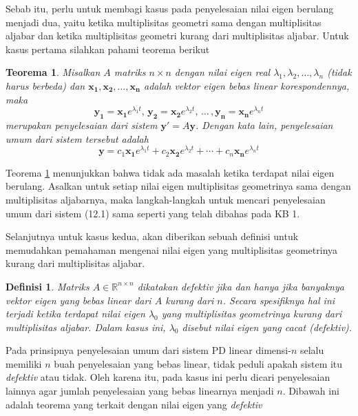 \documentclass[a4paper]{article}
\theoremstyle{definisi}
\newtheorem{definisi}{Definisi}[section]
\newtheorem{teorema}{Teorema}[section]
\numberwithin{equation}{section}
\newcommand{\R}{\mathbb{R}}
\begin{document}
  Sebab itu, perlu untuk membagi kasus pada penyelesaian nilai eigen berulang menjadi dua, yaitu ketika multiplisitas geometri sama dengan multiplisitas aljabar dan ketika multiplisitas geometri kurang dari multiplisitas aljabar. Untuk kasus pertama silahkan pahami teorema berikut
  \begin{teorema}\label{thm:multiplisitas_geometri_sama}
    Misalkan $A$ matriks $n\times n$ dengan nilai eigen real $\lambda_1,\lambda_2,\ldots,\lambda_n$ (tidak harus berbeda) dan $\mathbf{x_1},\mathbf{x_2},\ldots,\mathbf{x_n}$ adalah vektor eigen bebas linear korespondennya, maka
    \begin{equation*}
      \mathbf{y_1}=\mathbf{x_1}e^{\lambda_1t},\,\mathbf{y_2}=\mathbf{x_2}e^{\lambda_2t},\,\dots\,,\mathbf{y_n}=\mathbf{x_n}e^{\lambda_nt}
    \end{equation*}
    merupakan penyelesaian dari sistem $\mathbf{y'}=A\mathbf{y}$. Dengan kata lain, penyelesaian umum dari sistem tersebut adalah
    \begin{equation}
      \mathbf{y}=c_1\mathbf{x_1}e^{\lambda_1t}+c_2\mathbf{x_2}e^{\lambda_2t}+\cdots+c_n\mathbf{x_n}e^{\lambda_nt}
    \end{equation}
  \end{teorema}

  Teorema \ref{thm:multiplisitas_geometri_sama} menunjukkan bahwa tidak ada masalah ketika terdapat nilai eigen berulang. Asalkan untuk setiap nilai eigen multiplisitas geometrinya sama dengan multiplisitas aljabarnya, maka langkah-langkah untuk mencari penyelesaian umum dari sistem (12.1) sama seperti yang telah dibahas pada KB 1.

  Selanjutnya untuk kasus kedua, akan diberikan sebuah definisi untuk memudahkan pemahaman mengenai nilai eigen yang multiplisitas geometrinya kurang dari multiplisitas aljabar.

  \begin{definisi}
    Matriks $A\in\R^{n\times n}$ dikatakan \textit{defektiv} jika dan hanya jika banyaknya vektor eigen yang bebas linear dari $A$ kurang dari $n$. Secara spesifiknya hal ini terjadi ketika terdapat nilai eigen $\lambda_0$ yang multiplisitas geometrinya kurang dari multiplisitas aljabar. Dalam kasus ini, $\lambda_0$ disebut nilai eigen yang cacat (\textit{defektiv}).
  \end{definisi}

  Pada prinsipnya penyelesaian umum dari sistem PD linear dimensi-$n$ selalu memiliki $n$ buah penyelesaian yang bebas linear, tidak peduli apakah sistem itu \textit{defektiv} atau tidak. Oleh karena itu, pada kasus ini perlu dicari penyelesaian lainnya agar jumlah penyelesaian yang bebas linearnya menjadi $n$. Dibawah ini adalah teorema yang terkait dengan nilai eigen yang \textit{defektiv}
\end{document}
